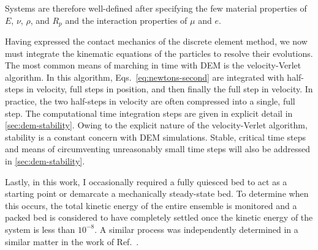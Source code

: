 Systems are therefore well-defined after specifying the few material properties of $E$, $\nu$, $\rho$, and $R_p$ and the interaction properties of $\mu$ and $e$.

Having expressed the contact mechanics of the discrete element method, we now must integrate the kinematic equations of the particles to resolve their evolutions. The most common means of marching in time with DEM is the velocity-Verlet algorithm\cite{Kruggel-Emden2008}. In this algorithm, Eqs.~\ref{eq:newtons-second} are integrated with half-steps in velocity, full steps in position, and then finally the full step in velocity. In practice, the two half-steps in velocity are often compressed into a single, full step. The computational time integration steps are given in explicit detail in \cref{sec:dem-stability}. Owing to the explicit nature of the velocity-Verlet algorithm, stability is a constant concern with DEM simulations. Stable, critical time steps and means of circumventing unreasonably small time steps will also be addressed in \cref{sec:dem-stability}.

Lastly, in this work, I occasionally required a fully quiesced bed to act as a starting point or demarcate a mechanically steady-state bed. To determine when this occurs, the total kinetic energy of the entire ensemble is monitored and a packed bed is considered to have completely settled once the kinetic energy of the system is less than $10^{-8}$. A similar process was independently determined in a similar matter in the work of Ref.~\cite{Silbert2002}. 